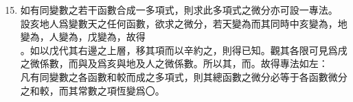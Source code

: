 \begin{enumerate} [label={第\chinese*款},nolistsep]
	\setcounter{enumi}{14}
	\item 如有同變數之若干函數合成一多項式，則求此多項式之微分亦可設一專法。\\
	設亥地人爲變數天之任何函數，欲求\CJKmove 之微分，若天變為\CJKmove 而其同時中亥變為\CJKmove，地變為\CJKmove，人變為\CJKmove，戊變為\CJKmove，故得\\\CJKmove。如以戊代其右邊之上層，移其項而以辛約之，則得已知\CJKmove。觀其各限可見\CJKmove 爲戌之微係數，而\CJKmove 與\CJKmove 及\CJKmove 爲亥與地及人之微係數。所以其\CJKmove，而\CJKmove。故得專法如左：\\
	凡有同變數之各函數和較而成之多項式，則其總函數之微分必等于各函數微分之和較，而其常數之項恆變爲〇。
\end{enumerate}

